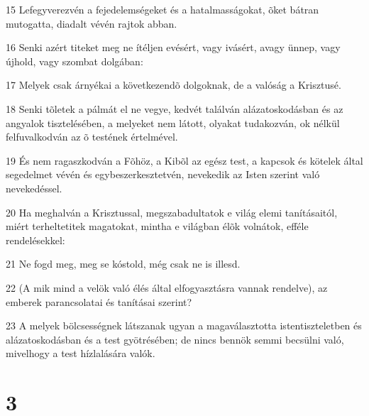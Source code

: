 \par 15 Lefegyverezvén a fejedelemségeket és a hatalmasságokat, õket bátran mutogatta, diadalt vévén rajtok abban.
\par 16 Senki azért titeket meg ne ítéljen evésért, vagy ivásért, avagy ünnep, vagy újhold, vagy szombat dolgában:
\par 17 Melyek csak árnyékai a következendõ dolgoknak, de a valóság a Krisztusé.
\par 18 Senki tõletek a pálmát el ne vegye, kedvét találván alázatoskodásban és az angyalok tisztelésében, a melyeket nem látott, olyakat tudakozván, ok nélkül felfuvalkodván az õ testének értelmével.
\par 19 És nem ragaszkodván a Fõhöz, a Kibõl az egész test, a kapcsok és kötelek által segedelmet vévén és egybeszerkesztetvén, nevekedik az Isten szerint való nevekedéssel.
\par 20 Ha meghalván a Krisztussal, megszabadultatok e világ elemi tanításaitól, miért terheltetitek magatokat, mintha e világban élõk volnátok, efféle rendelésekkel:
\par 21 Ne fogd meg, meg se kóstold, még csak ne is illesd.
\par 22 (A mik mind a velök való élés által elfogyasztásra vannak rendelve), az emberek parancsolatai és tanításai szerint?
\par 23 A melyek bölcsességnek látszanak ugyan a magaválasztotta istentiszteletben és alázatoskodásban és a test gyötrésében; de nincs bennök semmi becsülni való, mivelhogy a test hízlalására valók.

\chapter{3}

